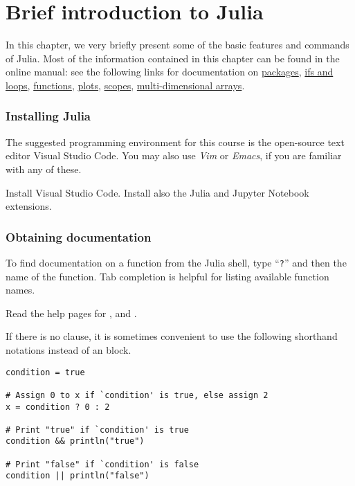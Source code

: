 \appendix
\chapter{Brief introduction to Julia}%
\label{cha:a_very_short_introduction_to_julia}

In this chapter,
we very briefly present  some of the basic features and commands of Julia.
Most of the information contained in this chapter can be found in the online manual:
see the following links for documentation on
\href{https://docs.julialang.org/en/v1/stdlib/Pkg/}{packages},
\href{https://docs.julialang.org/en/v1/manual/control-flow/} {ifs and loops},
\href{https://docs.julialang.org/en/v1/manual/functions/} {functions},
\href{https://docs.juliaplots.org/latest/tutorial/} {plots},
\href{https://docs.julialang.org/en/v1/manual/variables-and-scoping/#man-scope-table} {scopes},
\href{https://docs.julialang.org/en/v1/manual/arrays/} {multi-dimensional arrays}.

\subsection*{Installing Julia}%
\label{sub:installing_julia}
The suggested programming environment for this course is the open-source text editor Visual Studio Code.
You may also use \emph{Vim} or \emph{Emacs},
if you are familiar with any of these.

\begin{task}
    Install Visual Studio Code.
    Install also the Julia and Jupyter Notebook extensions.
\end{task}

\subsection*{Obtaining documentation}%
\label{sub:getting_documentation}

To find documentation on a function from the Julia shell,
type ``\texttt{?}'' and then the name of the function.
Tab completion is helpful for listing available function names.

\begin{task}
    Read the help pages for ,  and .
\end{task}

\begin{remark}
If there is no  clause,
it is sometimes convenient to use the following shorthand notations instead of an  block.
\begin{verbatim}
condition = true

# Assign 0 to x if `condition' is true, else assign 2
x = condition ? 0 : 2

# Print "true" if `condition' is true
condition && println("true")

# Print "false" if `condition' is false
condition || println("false")
\end{verbatim}
\end{remark}

